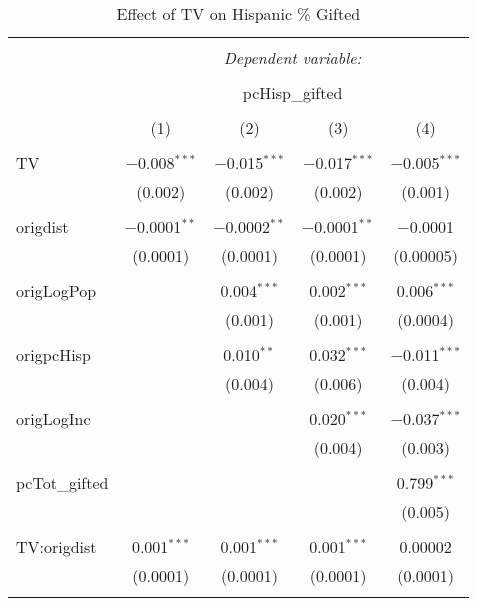 
\begin{table}[!htbp] \centering 
  \caption{Effect of TV on Hispanic \% Gifted} 
  \label{} 
\begin{tabular}{@{\extracolsep{5pt}}lcccc} 
\\[-1.8ex]\hline 
\hline \\[-1.8ex] 
 & \multicolumn{4}{c}{\textit{Dependent variable:}} \\ 
\cline{2-5} 
\\[-1.8ex] & \multicolumn{4}{c}{pcHisp\_gifted} \\ 
\\[-1.8ex] & (1) & (2) & (3) & (4)\\ 
\hline \\[-1.8ex] 
 TV & $-$0.008$^{***}$ & $-$0.015$^{***}$ & $-$0.017$^{***}$ & $-$0.005$^{***}$ \\ 
  & (0.002) & (0.002) & (0.002) & (0.001) \\ 
  & & & & \\ 
 origdist & $-$0.0001$^{**}$ & $-$0.0002$^{**}$ & $-$0.0001$^{**}$ & $-$0.0001 \\ 
  & (0.0001) & (0.0001) & (0.0001) & (0.00005) \\ 
  & & & & \\ 
 origLogPop &  & 0.004$^{***}$ & 0.002$^{***}$ & 0.006$^{***}$ \\ 
  &  & (0.001) & (0.001) & (0.0004) \\ 
  & & & & \\ 
 origpcHisp &  & 0.010$^{**}$ & 0.032$^{***}$ & $-$0.011$^{***}$ \\ 
  &  & (0.004) & (0.006) & (0.004) \\ 
  & & & & \\ 
 origLogInc &  &  & 0.020$^{***}$ & $-$0.037$^{***}$ \\ 
  &  &  & (0.004) & (0.003) \\ 
  & & & & \\ 
 pcTot\_gifted &  &  &  & 0.799$^{***}$ \\ 
  &  &  &  & (0.005) \\ 
  & & & & \\ 
 TV:origdist & 0.001$^{***}$ & 0.001$^{***}$ & 0.001$^{***}$ & 0.00002 \\ 
  & (0.0001) & (0.0001) & (0.0001) & (0.0001) \\ 
  & & & & \\ 

\end{tabular}
\end{table}
